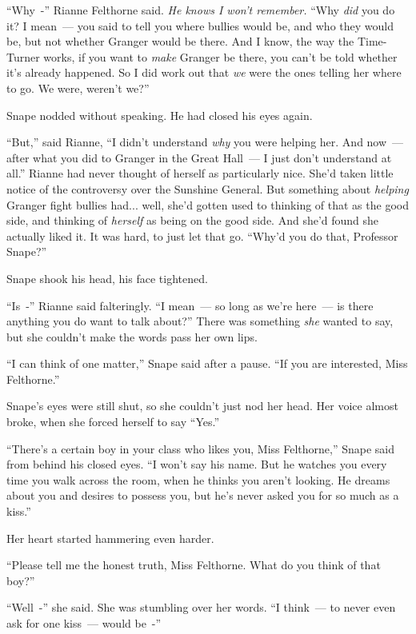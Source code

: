 ``Why~-'' Rianne Felthorne said. \emph{He knows I won't remember.} ``Why \emph{did} you do it? I mean~--- you said to tell you where bullies would be, and who they would be, but not whether Granger would be there. And I know, the way the Time-Turner works, if you want to \emph{make} Granger be there, you can't be told whether it's already happened. So I did work out that \emph{we} were the ones telling her where to go. We were, weren't we?''

Snape nodded without speaking. He had closed his eyes again.

``But,'' said Rianne, ``I didn't understand \emph{why} you were helping her. And now~--- after what you did to Granger in the Great Hall~--- I just don't understand at all.'' Rianne had never thought of herself as particularly nice. She'd taken little notice of the controversy over the Sunshine General. But something about \emph{helping} Granger fight bullies had... well, she'd gotten used to thinking of that as the good side, and thinking of \emph{herself} as being on the good side. And she'd found she actually liked it. It was hard, to just let that go. ``Why'd you do that, Professor Snape?''

Snape shook his head, his face tightened.

``Is~-'' Rianne said falteringly. ``I mean~--- so long as we're here~--- is there anything you do want to talk about?'' There was something \emph{she} wanted to say, but she couldn't make the words pass her own lips.

``I can think of one matter,'' Snape said after a pause. ``If you are interested, Miss Felthorne.''

Snape's eyes were still shut, so she couldn't just nod her head. Her voice almost broke, when she forced herself to say ``Yes.''

``There's a certain boy in your class who likes you, Miss Felthorne,'' Snape said from behind his closed eyes. ``I won't say his name. But he watches you every time you walk across the room, when he thinks you aren't looking. He dreams about you and desires to possess you, but he's never asked you for so much as a kiss.''

Her heart started hammering even harder.

``Please tell me the honest truth, Miss Felthorne. What do you think of that boy?''

``Well~-'' she said. She was stumbling over her words. ``I think~--- to never even ask for one kiss~--- would be~-''

